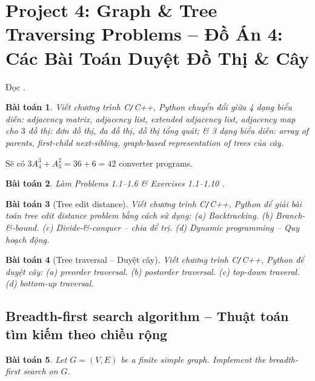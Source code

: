 \documentclass{article}
\newtheorem{baitoan}{Bài toán}
\begin{document}

\section{Project 4: Graph \& Tree Traversing Problems -- Đồ Án 4: Các Bài Toán Duyệt Đồ Thị \& Cây}
Đọc \cite[1.3: Representation of Trees \& Graphs, p. 23]{Valiente2021}.
\begin{baitoan}
    Viết chương trình {\sf C{\tt/}C++, Python} chuyển đổi giữa 4 dạng biểu diễn: adjacency matrix, adjacency list, extended adjacency list, adjacency map cho $3$ đồ thị: đơn đồ thị, đa đồ thị, đồ thị tổng quát; \& 3 dạng biểu diễn: array of parents, first-child next-sibling, graph-based representation of trees của cây.
\end{baitoan}
Sẽ có $3A_4^3 + A_3^2 = 36 + 6 = 42$ converter programs.

\begin{baitoan}
    Làm Problems 1.1--1.6 \& Exercises 1.1--1.10 \cite[pp. 39--40]{Valiente2021}.
\end{baitoan}

\begin{baitoan}[Tree edit distance]
    Viết chương trình {\sf C{\tt/}C++, Python} để giải bài toán tree edit distance problem bằng cách sử dụng: (a) Backtracking. (b) Branch-\&-bound. (c) Divide-\&-conquer -- chia để trị. (d) Dynamic programming -- Quy hoạch động.
\end{baitoan}

\begin{baitoan}[Tree traversal -- Duyệt cây]
    Viết chương trình {\sf C{\tt/}C++, Python} để duyệt cây: (a) preorder traversal. (b) postorder traversal. (c) top-down traveral. (d) bottom-up traversal.
\end{baitoan}


\subsection{Breadth-first search algorithm -- Thuật toán tìm kiếm theo chiều rộng}

\begin{baitoan}
    Let $G = (V,E)$ be a finite simple graph. Implement the breadth-first search on $G$.
\end{baitoan}
\end{document}
